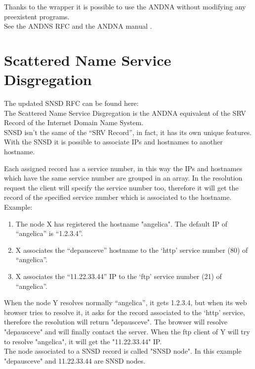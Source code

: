 \documentclass[a4paper]{article}
\begin{document}
Thanks to the wrapper it is possible to use the ANDNA without modifying
any preexistent programs.\\
  
See the ANDNS RFC \cite{ANDNSRFC} and the ANDNA manual \cite{manandna}.

\section{Scattered Name Service Disgregation}
The updated SNSD RFC can be found here: \cite{snsd}\\

The Scattered Name Service Disgregation is the ANDNA equivalent of the
SRV Record\cite{SRV} of the Internet Domain Name System.\\

SNSD isn't the same of the ``SRV Record'', in fact, it has its own unique
features.\\
  
With the SNSD it is possible to associate IPs and hostnames to another
hostname.

Each assigned record has a service number, in this way the IPs and hostnames
which have the same service number are grouped in an array.
In the resolution request the client will specify the service number too,
therefore it will get the record of the specified service number which is 
associated to the hostname. Example:
\begin{enumerate}
	\item The node X has registered the hostname "angelica". The default
		IP of ``angelica'' is ``1.2.3.4''.
	\item  X associates the ``depausceve'' hostname to the `http' service
		number (80) of ``angelica''.
	\item  X associates the ``11.22.33.44'' IP to the `ftp' service number (21) of
  ``angelica''.
\end{enumerate}
  
When the node Y resolves normally ``angelica'', it gets 1.2.3.4, but when
its web browser tries to resolve it, it asks for the record associated to
the `http' service, therefore the resolution will return "depausceve".
The browser will resolve "depausceve" and will finally contact the server.
When the ftp client of Y will try to resolve "angelica", it will get the
"11.22.33.44" IP.\\
  
The node associated to a SNSD record is called "SNSD node". In this example
"depausceve" and 11.22.33.44 are SNSD nodes.\\
\end{document}
